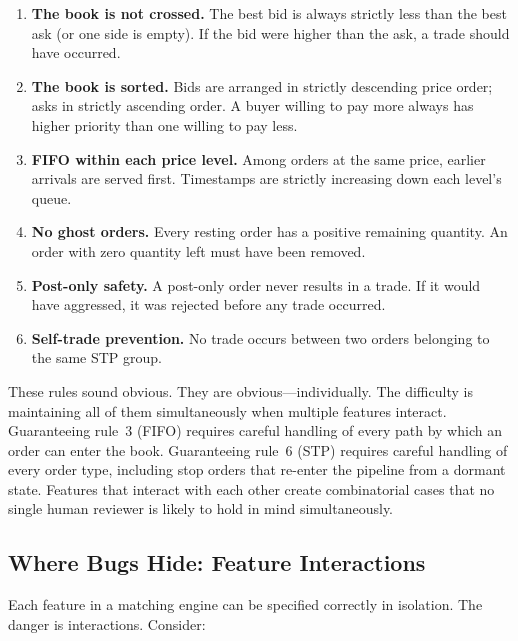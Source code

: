 \documentclass[11pt,a4paper]{article}
\begin{document}
\begin{enumerate}[nosep]
\item \textbf{The book is not crossed.} The best bid is always strictly
      less than the best ask (or one side is empty). If the bid were
      higher than the ask, a trade should have occurred.

\item \textbf{The book is sorted.} Bids are arranged in strictly
      descending price order; asks in strictly ascending order. A buyer
      willing to pay more always has higher priority than one willing to
      pay less.

\item \textbf{FIFO within each price level.} Among orders at the same
      price, earlier arrivals are served first. Timestamps are
      strictly increasing down each level's queue.

\item \textbf{No ghost orders.} Every resting order has a positive
      remaining quantity. An order with zero quantity left must have
      been removed.

\item \textbf{Post-only safety.} A post-only order never results in a
      trade. If it would have aggressed, it was rejected before any
      trade occurred.

\item \textbf{Self-trade prevention.} No trade occurs between two
      orders belonging to the same STP group.
\end{enumerate}

These rules sound obvious. They are obvious---individually. The
difficulty is maintaining all of them simultaneously when multiple
features interact. Guaranteeing rule~3 (FIFO) requires careful handling
of every path by which an order can enter the book. Guaranteeing
rule~6 (STP) requires careful handling of every order type, including
stop orders that re-enter the pipeline from a dormant state. Features
that interact with each other create combinatorial cases that no single
human reviewer is likely to hold in mind simultaneously.

\subsection{Where Bugs Hide: Feature Interactions}
\label{sec:feature-interactions}

Each feature in a matching engine can be specified correctly in
isolation. The danger is interactions. Consider:
\end{document}
